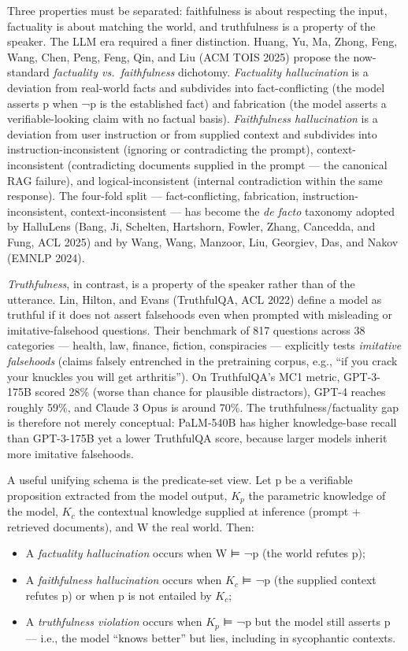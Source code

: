 Three properties must be separated: faithfulness is about respecting the input, factuality is about matching the world, and truthfulness is a property of the speaker. The LLM era required a finer distinction. Huang, Yu, Ma, Zhong, Feng, Wang, Chen, Peng, Feng, Qin, and Liu (ACM TOIS 2025) propose the now-standard \emph{factuality vs.~faithfulness} dichotomy. \emph{Factuality hallucination} is a deviation from real-world facts and subdivides into fact-conflicting (the model asserts p when ¬p is the established fact) and fabrication (the model asserts a verifiable-looking claim with no factual basis). \emph{Faithfulness hallucination} is a deviation from user instruction or from supplied context and subdivides into instruction-inconsistent (ignoring or contradicting the prompt), context-inconsistent (contradicting documents supplied in the prompt --- the canonical RAG failure), and logical-inconsistent (internal contradiction within the same response). The four-fold split --- fact-conflicting, fabrication, instruction-inconsistent, context-inconsistent --- has become the \emph{de facto} taxonomy adopted by HalluLens (Bang, Ji, Schelten, Hartshorn, Fowler, Zhang, Cancedda, and Fung, ACL 2025) and by Wang, Wang, Manzoor, Liu, Georgiev, Das, and Nakov (EMNLP 2024).

\emph{Truthfulness}, in contrast, is a property of the speaker rather than of the utterance. Lin, Hilton, and Evans (TruthfulQA, ACL 2022) define a model as truthful if it does not assert falsehoods even when prompted with misleading or imitative-falsehood questions. Their benchmark of 817 questions across 38 categories --- health, law, finance, fiction, conspiracies --- explicitly tests \emph{imitative falsehoods} (claims falsely entrenched in the pretraining corpus, e.g., ``if you crack your knuckles you will get arthritis''). On TruthfulQA's MC1 metric, GPT-3-175B scored 28\% (worse than chance for plausible distractors), GPT-4 reaches roughly 59\%, and Claude 3 Opus is around 70\%. The truthfulness/factuality gap is therefore not merely conceptual: PaLM-540B has higher knowledge-base recall than GPT-3-175B yet a lower TruthfulQA score, because larger models inherit more imitative falsehoods.

A useful unifying schema is the predicate-set view. Let p be a verifiable proposition extracted from the model output, \(K_p\) the parametric knowledge of the model, \(K_c\) the contextual knowledge supplied at inference (prompt + retrieved documents), and W the real world. Then:

\begin{itemize}
\tightlist
\item
  A \emph{factuality hallucination} occurs when W ⊨ ¬p (the world refutes p);
\item
  A \emph{faithfulness hallucination} occurs when \(K_c\) ⊨ ¬p (the supplied context refutes p) or when p is not entailed by \(K_c\);
\item
  A \emph{truthfulness violation} occurs when \(K_p\) ⊨ ¬p but the model still asserts p --- i.e., the model ``knows better'' but lies, including in sycophantic contexts.
\end{itemize}

